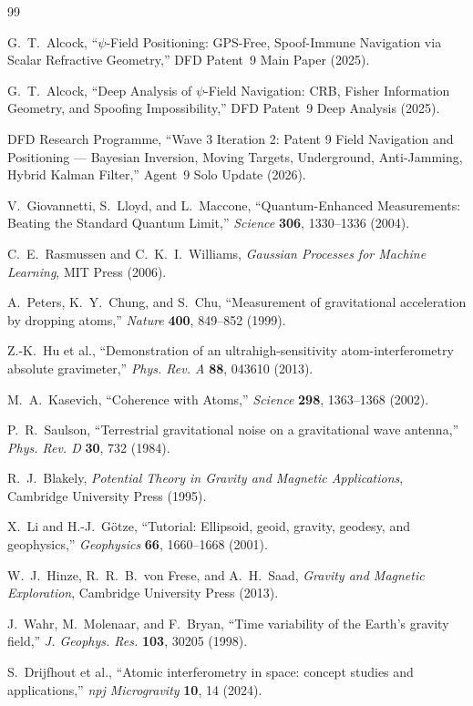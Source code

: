 \documentclass[aps,prd,twocolumn,superscriptaddress,nofootinbib]{revtex4-2}
\begin{document}
\begin{thebibliography}{99}

G.~T.~Alcock,
``$\psi$-Field Positioning: GPS-Free, Spoof-Immune Navigation via
Scalar Refractive Geometry,''
DFD Patent~9 Main Paper (2025).

G.~T.~Alcock,
``Deep Analysis of $\psi$-Field Navigation: CRB, Fisher Information
Geometry, and Spoofing Impossibility,''
DFD Patent~9 Deep Analysis (2025).

DFD Research Programme,
``Wave 3 Iteration 2: Patent 9 Field Navigation and Positioning ---
Bayesian Inversion, Moving Targets, Underground, Anti-Jamming,
Hybrid Kalman Filter,''
Agent~9 Solo Update (2026).

V.~Giovannetti, S.~Lloyd, and L.~Maccone,
``Quantum-Enhanced Measurements: Beating the Standard Quantum Limit,''
\emph{Science} \textbf{306}, 1330--1336 (2004).

C.~E.~Rasmussen and C.~K.~I.~Williams,
\emph{Gaussian Processes for Machine Learning},
MIT Press (2006).

A.~Peters, K.~Y.~Chung, and S.~Chu,
``Measurement of gravitational acceleration by dropping atoms,''
\emph{Nature} \textbf{400}, 849--852 (1999).

Z.-K.~Hu et al.,
``Demonstration of an ultrahigh-sensitivity atom-interferometry absolute
gravimeter,''
\emph{Phys. Rev. A} \textbf{88}, 043610 (2013).

M.~A.~Kasevich,
``Coherence with Atoms,''
\emph{Science} \textbf{298}, 1363--1368 (2002).

P.~R.~Saulson,
``Terrestrial gravitational noise on a gravitational wave antenna,''
\emph{Phys. Rev. D} \textbf{30}, 732 (1984).

R.~J.~Blakely,
\emph{Potential Theory in Gravity and Magnetic Applications},
Cambridge University Press (1995).

X.~Li and H.-J.~G{\"o}tze,
``Tutorial: Ellipsoid, geoid, gravity, geodesy, and geophysics,''
\emph{Geophysics} \textbf{66}, 1660--1668 (2001).

W.~J.~Hinze, R.~R.~B.~von Frese, and A.~H.~Saad,
\emph{Gravity and Magnetic Exploration},
Cambridge University Press (2013).

J.~Wahr, M.~Molenaar, and F.~Bryan,
``Time variability of the Earth's gravity field,''
\emph{J. Geophys. Res.} \textbf{103}, 30205 (1998).

S.~Drijfhout et al.,
``Atomic interferometry in space: concept studies and applications,''
\emph{npj Microgravity} \textbf{10}, 14 (2024).

\end{thebibliography}
\end{document}
